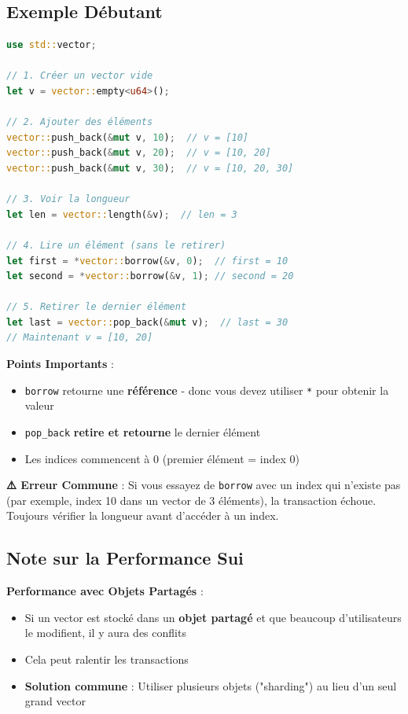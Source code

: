 \documentclass[11pt]{article}
\begin{document}
\subsection{Exemple Débutant}

\begin{lstlisting}[language=Rust, caption=Exemple Complet d'Utilisation de Vector]
use std::vector;

// 1. Créer un vector vide
let v = vector::empty<u64>();

// 2. Ajouter des éléments
vector::push_back(&mut v, 10);  // v = [10]
vector::push_back(&mut v, 20);  // v = [10, 20]
vector::push_back(&mut v, 30);  // v = [10, 20, 30]

// 3. Voir la longueur
let len = vector::length(&v);  // len = 3

// 4. Lire un élément (sans le retirer)
let first = *vector::borrow(&v, 0);  // first = 10
let second = *vector::borrow(&v, 1); // second = 20

// 5. Retirer le dernier élément
let last = vector::pop_back(&mut v);  // last = 30
// Maintenant v = [10, 20]
\end{lstlisting}

\begin{noteBox}
\textbf{Points Importants} :
\begin{itemize}
  \item \texttt{borrow} retourne une \textbf{référence} - donc vous devez utiliser \texttt{*} pour obtenir la valeur
  \item \texttt{pop\_back} \textbf{retire et retourne} le dernier élément
  \item Les indices commencent à 0 (premier élément = index 0)
\end{itemize}
\end{noteBox}

\begin{warnBox}
\textbf{⚠️ Erreur Commune} : Si vous essayez de \texttt{borrow} avec un index qui n'existe pas (par exemple, index 10 dans un vector de 3 éléments), la transaction échoue. Toujours vérifier la longueur avant d'accéder à un index.
\end{warnBox}

\subsection{Note sur la Performance Sui}

\begin{explainBox}
\textbf{Performance avec Objets Partagés} :
\begin{itemize}
  \item Si un vector est stocké dans un \textbf{objet partagé} et que beaucoup d'utilisateurs le modifient, il y aura des conflits
  \item Cela peut ralentir les transactions
  \item \textbf{Solution commune} : Utiliser plusieurs objets ("sharding") au lieu d'un seul grand vector
\end{itemize}
\end{explainBox}
\end{document}
